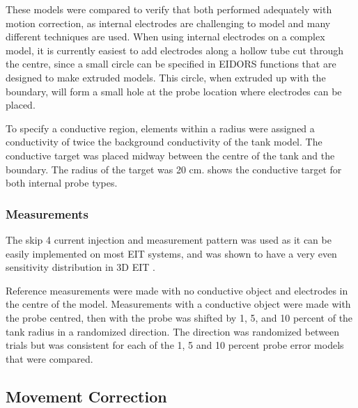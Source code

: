 These models were compared to verify that both 
performed adequately with motion correction, as internal electrodes 
are challenging to model and many different techniques are used. 
When using internal electrodes on a complex model, it is currently easiest 
to add electrodes along a hollow tube cut through the centre, since 
a small circle can be specified in EIDORS functions that are designed to make extruded 
models. This circle, when extruded up with the boundary, will form 
a small hole at the
probe location where electrodes can be placed.

To specify a conductive region, elements within a radius were assigned a conductivity 
of twice the background conductivity of the tank model.
The conductive target was placed midway between the centre of the tank and the boundary. 
The radius of the target was 20 cm. 
 shows the conductive target for both internal probe types.

\subsubsection{Measurements}
The skip 4 current injection and measurement pattern was used as it can be 
easily implemented on most EIT systems, and was shown to have a very even 
sensitivity distribution in 3D EIT \parencite{grychtol_3d_2016}.

Reference measurements were made with no conductive object and 
electrodes in the centre of the model. Measurements with a conductive object were made 
with the probe centred, then
with the probe was shifted by 1, 5, and 10 percent of the tank radius in a randomized 
direction. The direction was randomized between trials but was consistent for 
each of the 1, 5 and 10 percent probe error models that were compared. 

\subsection{Movement Correction}
\label{sec:3_methods}

